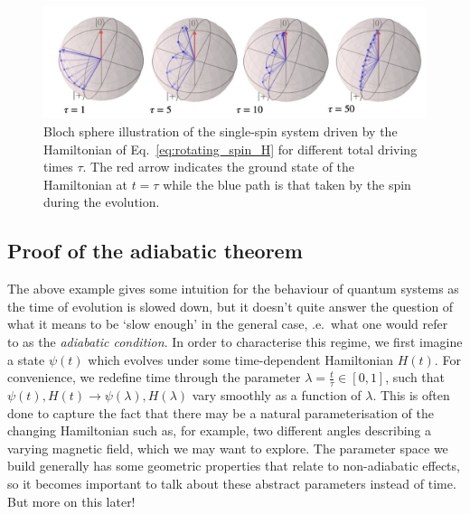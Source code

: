 \documentclass[a4paper,oneside,11pt]{book}
\providecommand{\DIFaddtex}[1]{{\protect\color{blue}\uwave{#1}}} %
\providecommand{\DIFdeltex}[1]{{\protect\color{red}\sout{#1}}}                      %
\providecommand{\DIFaddbegin}{} %
\providecommand{\DIFaddend}{} %
\providecommand{\DIFdelbegin}{} %
\providecommand{\DIFdelend}{} %
\providecommand{\DIFadd}[1]{\texorpdfstring{\DIFaddtex{#1}}{#1}} %
\providecommand{\DIFdel}[1]{\texorpdfstring{\DIFdeltex{#1}}{}} %
\newcommand{\DIFscaledelfig}{0.5}
\newlength{\DIFdelgraphicswidth} %
\newlength{\DIFdelgraphicsheight} %
\newcommand{\DIFaddincludegraphics}[2][]{{\color{blue}\fbox{\DIFOincludegraphics[#1]{#2}}}} %
\newcommand{\DIFdelincludegraphics}[2][]{%
\sbox{\DIFdelgraphicsbox}{\DIFOincludegraphics[#1]{#2}}%
\settoboxwidth{\DIFdelgraphicswidth}{\DIFdelgraphicsbox} %
\settoboxtotalheight{\DIFdelgraphicsheight}{\DIFdelgraphicsbox} %
\scalebox{\DIFscaledelfig}{%
\parbox[b]{\DIFdelgraphicswidth}{\usebox{\DIFdelgraphicsbox}\\[-\baselineskip] \rule{\DIFdelgraphicswidth}{0em}}\llap{\resizebox{\DIFdelgraphicswidth}{\DIFdelgraphicsheight}{%
\setlength{\unitlength}{\DIFdelgraphicswidth}%
\begin{picture}(1,1)%
\thicklines\linethickness{2pt} %
{\color[rgb]{1,0,0}\put(0,0){\framebox(1,1){}}}%
{\color[rgb]{1,0,0}\put(0,0){\line( 1,1){1}}}%
{\color[rgb]{1,0,0}\put(0,1){\line(1,-1){1}}}%
\end{picture}%
}\hspace*{3pt}}} %
} %
\DeclareRobustCommand{\DIFaddbegin}{\DIFOaddbegin \let\includegraphics\DIFaddincludegraphics} %
\DeclareRobustCommand{\DIFaddend}{\DIFOaddend \let\includegraphics\DIFOincludegraphics} %
\DeclareRobustCommand{\DIFdelbegin}{\DIFOdelbegin \let\includegraphics\DIFdelincludegraphics} %
\DeclareRobustCommand{\DIFdelend}{\DIFOaddend \let\includegraphics\DIFOincludegraphics} %
\begin{document}
    \begin{figure}[t]
    \centering
    \includegraphics[width=0.9\linewidth]{images/magnetic_field_spin.png} \caption[Rotating spin Bloch sphere illustrations]{Bloch sphere illustration of the single-spin system driven by the Hamiltonian of Eq.~\eqref{eq:rotating_spin_H} for different total driving times $\tau$. The red arrow indicates the ground state of the Hamiltonian at $t = \tau$ while the blue path is that taken by the spin during the evolution.}\label{fig:bloch_rotating_spin}
    \end{figure}

    \subsection{Proof of the adiabatic theorem}\label{sec:2.1.1_proof_adiabatic_theorem}

    The above example gives some intuition for the behaviour of quantum systems as the time of evolution is slowed down, but it doesn't quite answer the question of what it means to be `slow enough' in the general case, \@i.e.~what one would refer to as the \emph{adiabatic condition}. In order to characterise this regime, we first imagine a state \DIFdelbegin \DIFdel{$\psi(t)$ }\DIFdelend \DIFaddbegin \DIFadd{$\ket{\psi(t)}$ }\DIFaddend which evolves under some time-dependent Hamiltonian $H(t)$. For convenience, we redefine time through the parameter $\lambda = \frac{t}{\tau} \in [0,1]$, such that $\psi(t), H(t) \rightarrow \psi(\lambda), H(\lambda)$ vary smoothly as a function of $\lambda$. This is often done to capture the fact that there may be a natural parameterisation of the changing Hamiltonian such as, for example, two different angles describing a varying magnetic field, which we may want to explore. The parameter space we build generally has some geometric properties that relate to non-adiabatic effects, so it becomes important to talk about these abstract parameters instead of time. But more on this later!
\end{document}

